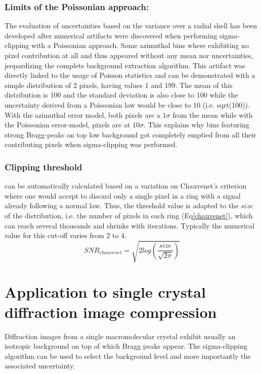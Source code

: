 \documentclass[preprint]{iucr}              %
\begin{document}
\subsubsection{Limits of the Poissonian approach:}
The evaluation of uncertainties based on the variance over a radial shell has been developed after numerical artifacts were discovered when performing sigma-clipping with a Poissonian approach. Some azimuthal bins where exhibiting no pixel contribution at all and thus appeared without any mean nor uncertainties, jeopardizing the complete background extraction algorithm. 
This artifact was directly linked to the usage of Poisson statistics and can be demonstrated with a simple distribution of 2 pixels, having values 1 and 199. 
The mean of this distribution is 100 and the standard deviation is also close to 100 while the uncertainty derived from a Poissonian law would  be close to 10 (i.e. sqrt(100)). 
With the azimuthal error model, both pixels are a $1\sigma$ from the mean while with the Poissonian error-model, pixels are at $10 \sigma$.  
This explains why bins featuring strong Bragg-peaks on top low background got completely emptied from all their contributing pixels when sigma-clipping was performed.

\subsubsection{Clipping threshold}
can be automatically calculated based on a variation on Chauvenet's criterion \cite{chauvenet} where one would accept to discard only a single pixel in a ring with a signal already following a normal law. 
Thus, the threshold value is adapted to the $size$ of the distribution, i.e. the number of pixels in each ring (Eq\ref{chauvenet}), which can reach several thousands and shrinks with iterations.
Typically the numerical value for this cut-off varies from 2 to 4.   
\begin{equation}
\label{chauvenet}
SNR_{chauvenet} =  \sqrt{2 log(\frac{size}{\sqrt{2 \pi}})}
\end{equation}

\section{Application to single crystal diffraction image compression}
Diffraction images from a single macromolecular crystal exhibit usually an isotropic background on top of which Bragg peaks appear.
The sigma-clipping algorithm can be used to select the background level and more importantly the associated uncertainty.
\end{document}
